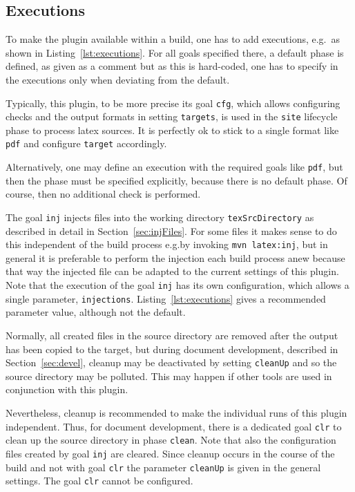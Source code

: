 \subsection{Executions}\label{subsec:xmlPomExecutions}

To make the plugin available within a build,
one has to add executions, e.g.~as shown in Listing~\ref{lst:executions}. 
For all goals specified there, a default phase is defined, 
as given as a comment but as this is hard-coded, 
one has to specify in the executions only 
when deviating from the default. 

Typically, this plugin, to be more precise its goal \texttt{cfg}, 
which allows configuring checks and the output formats in setting \texttt{targets},  
is used in the \texttt{site} lifecycle phase 
to process latex sources. 
It is perfectly ok to stick to a single format like \texttt{pdf} 
and configure \texttt{target} accordingly. 

Alternatively, one may define an execution with the required goals like \texttt{pdf}, 
but then the phase must be specified explicitly, because there is no default phase. 
Of course, then no additional check is performed. 

The goal \texttt{inj} injects files into the working directory \texttt{texSrcDirectory} 
as described in detail in Section~\ref{sec:injFiles}. 
For some files it makes sense to do this independent of the build process 
e.g.\@ by invoking \texttt{mvn latex:inj}, 
but in general it is preferable to perform the injection each build process anew 
because that way the injected file can be adapted 
to the current settings of this plugin. 
Note that the execution of the goal \texttt{inj} has its own configuration, 
which allows a single parameter, \texttt{injections}. 
Listing~\ref{lst:executions} gives a recommended parameter value, 
although not the default. 

Normally, all created files in the source directory are removed 
after the output has been copied to the target, 
but during document development, described in Section~\ref{sec:devel}, 
cleanup may be deactivated by setting \texttt{cleanUp} 
and so the source directory may be polluted. 
This may happen if other tools are used in conjunction with this plugin. 

Nevertheless, cleanup is recommended to make the individual runs of this plugin independent.
Thus, for document development, there is a dedicated goal \texttt{clr} 
to clean up the source directory in phase \texttt{clean}. 
Note that also the configuration files created by goal \texttt{inj} are cleared. 
Since cleanup occurs in the course of the build and not with goal \texttt{clr} 
the parameter \texttt{cleanUp} is given in the general settings. 
The goal \texttt{clr} cannot be configured. 

